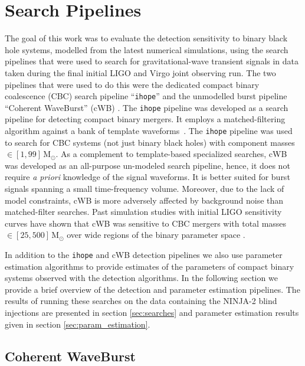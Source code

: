 \documentclass[12pt]{iopart}
\newcommand{\ihope}{\texttt{ihope}}
\begin{document}
\section{Search Pipelines}
\label{sec:pipelines}

The goal of this work was to evaluate the detection sensitivity to
binary black hole systems, modelled from the latest numerical
simulations, using the search pipelines that were used to search for
gravitational-wave transient signals in data taken during the final
initial LIGO and Virgo joint observing run.  The two pipelines that
were used to do this were the dedicated compact binary coalescence
(CBC) search pipeline ``\ihope{}'' \cite{Abbott:2009tt, Abbott:2009qj,
Abadie:2011kd, Colaboration:2011np, Aasi:2012rja, Babak:2012zx}
and the unmodelled burst pipeline ``Coherent WaveBurst'' (cWB)
\cite{Abbott:2007wu, Abadie:2010mt, Abadie:2012rq, Virgo:2012aa}. The
\ihope{} pipeline was developed as a search pipeline for detecting
compact binary mergers. It employs a matched-filtering algorithm
against a bank of template waveforms~\cite{Babak:2012zx}. The \ihope{}
pipeline was used to search for CBC systems (not just binary black
holes) with component masses $\in [1,99]\, \mathrm{M}_{\odot}$.  As a
complement to template-based specialized searches, cWB was developed
as an all-purpose un-modeled search pipeline, hence, it does not
require \emph{a priori} knowledge of the signal waveforms. It is
better suited for burst signals spanning a small time-frequency
volume. Moreover, due to the lack of model constraints, cWB is more
adversely affected by background noise than matched-filter searches.
Past simulation studies with initial LIGO sensitivity curves have
shown that cWB was sensitive to CBC mergers with total masses $\in
[25,500]\, \mathrm{M}_{\odot}$ over wide regions of the binary
parameter space \cite{Pankow:2009nx}.

In addition to the \ihope{} and cWB detection pipelines we also use parameter 
estimation algorithms to provide estimates of the parameters of compact binary 
systems observed with the detection algorithms. 
In the following section we provide a brief overview of the detection and 
parameter estimation pipelines.
The results of running these searches on the data containing the NINJA-2 blind
injections are presented in section \ref{sec:searches} and parameter estimation 
results given in section \ref{sec:param_estimation}.

\subsection{Coherent WaveBurst}
\label{ssec:cwb_pipelines}
\end{document}
